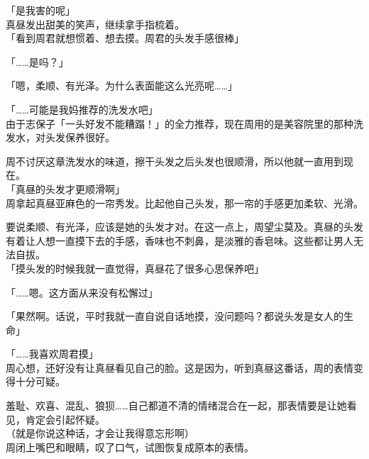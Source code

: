 「是我害的呢」\\

真昼发出甜美的笑声，继续拿手指梳着。\\

「看到周君就想惯着、想去摸。周君的头发手感很棒」

「……是吗？」

「嗯，柔顺、有光泽。为什么表面能这么光亮呢……」

「……可能是我妈推荐的洗发水吧」\\

由于志保子「一头好发不能糟蹋！」的全力推荐，现在周用的是美容院里的那种洗发水，对头发保养很好。

周不讨厌这章洗发水的味道，擦干头发之后头发也很顺滑，所以他就一直用到现在。\\

「真昼的头发才更顺滑啊」\\

周拿起真昼亚麻色的一帘秀发。比起他自己头发，那一帘的手感更加柔软、光滑。

要说柔顺、有光泽，应该是她的头发才对。在这一点上，周望尘莫及。真昼的头发有着让人想一直摸下去的手感，香味也不刺鼻，是淡雅的香皂味。这些都让男人无法自拔。\\

「摸头发的时候我就一直觉得，真昼花了很多心思保养吧」

「……嗯。这方面从来没有松懈过」

「果然啊。话说，平时我就一直自说自话地摸，没问题吗？都说头发是女人的生命」

「……我喜欢周君摸」\\

周心想，还好没有让真昼看见自己的脸。这是因为，听到真昼这番话，周的表情变得十分可疑。

羞耻、欢喜、混乱、狼狈……自己都道不清的情绪混合在一起，那表情要是让她看见，肯定会引起怀疑。\\

（就是你说这种话，才会让我得意忘形啊）\\

周闭上嘴巴和眼睛，叹了口气，试图恢复成原本的表情。
